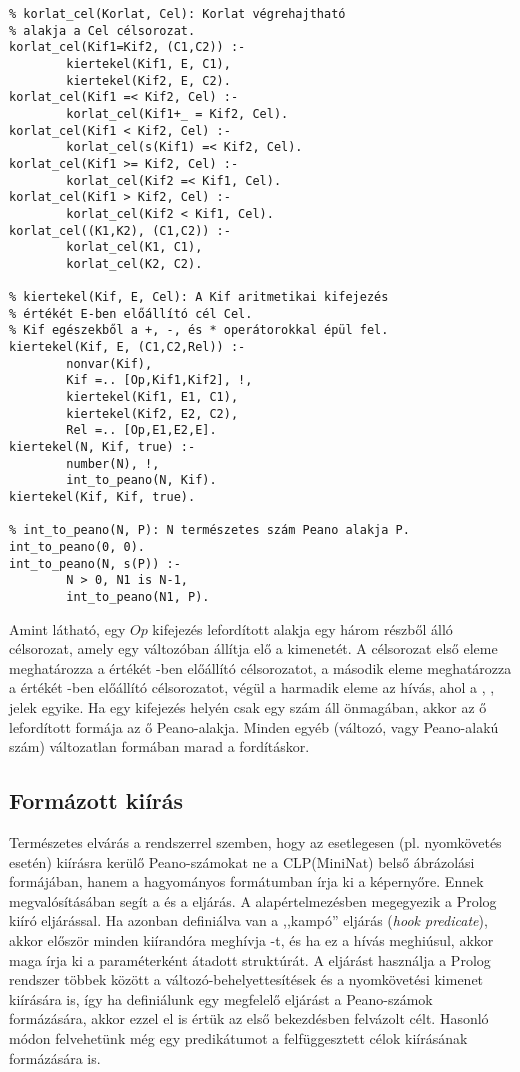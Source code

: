\begin{verbatim}
% korlat_cel(Korlat, Cel): Korlat végrehajtható
% alakja a Cel célsorozat.
korlat_cel(Kif1=Kif2, (C1,C2)) :-
        kiertekel(Kif1, E, C1), 
        kiertekel(Kif2, E, C2). 
korlat_cel(Kif1 =< Kif2, Cel) :- 
        korlat_cel(Kif1+_ = Kif2, Cel). 
korlat_cel(Kif1 < Kif2, Cel) :- 
        korlat_cel(s(Kif1) =< Kif2, Cel). 
korlat_cel(Kif1 >= Kif2, Cel) :- 
        korlat_cel(Kif2 =< Kif1, Cel). 
korlat_cel(Kif1 > Kif2, Cel) :- 
        korlat_cel(Kif2 < Kif1, Cel). 
korlat_cel((K1,K2), (C1,C2)) :- 
        korlat_cel(K1, C1), 
        korlat_cel(K2, C2). 

% kiertekel(Kif, E, Cel): A Kif aritmetikai kifejezés 
% értékét E-ben előállító cél Cel. 
% Kif egészekből a +, -, és * operátorokkal épül fel. 
kiertekel(Kif, E, (C1,C2,Rel)) :- 
        nonvar(Kif), 
        Kif =.. [Op,Kif1,Kif2], !, 
        kiertekel(Kif1, E1, C1), 
        kiertekel(Kif2, E2, C2), 
        Rel =.. [Op,E1,E2,E]. 
kiertekel(N, Kif, true) :- 
        number(N), !,  
        int_to_peano(N, Kif). 
kiertekel(Kif, Kif, true). 

% int_to_peano(N, P): N természetes szám Peano alakja P. 
int_to_peano(0, 0). 
int_to_peano(N, s(P)) :- 
        N > 0, N1 is N-1,  
        int_to_peano(N1, P).
\end{verbatim}

Amint látható, egy  $Op$  kifejezés lefordított alakja
egy három részből álló célsorozat, amely egy  változóban állítja
elő a kimenetét. A célsorozat első eleme meghatározza a  értékét
-ben előállító célsorozatot, a második eleme meghatározza a
 értékét -ben előállító célsorozatot, végül a harmadik
eleme az  hívás, ahol  a \cd{+}, \cd{-}, \cd{*}
jelek egyike. Ha egy kifejezés helyén csak egy szám áll önmagában, akkor az ő
lefordított formája az ő Peano-alakja. Minden egyéb (változó, vagy Peano-alakú
szám) változatlan formában marad a fordításkor.

\subsection{Formázott kiírás}

Természetes elvárás a rendszerrel szemben, hogy az esetlegesen (pl. nyomkövetés
esetén) kiírásra kerülő Peano-számokat ne a CLP(MiniNat) belső ábrázolási
formájában, hanem a hagyományos formátumban írja ki a képernyőre. Ennek
megvalósításában segít a  és a  eljárás.
\br
A  alapértelmezésben megegyezik a  Prolog kiíró
eljárással. Ha azonban definiálva van a  ,,kampó'' eljárás
(\emph{hook predicate}), akkor először minden kiírandóra meghívja
-t, és ha ez a hívás meghiúsul, akkor maga írja ki a
paraméterként átadott struktúrát. A  eljárást használja a
Prolog rendszer többek között a változó-behelyettesítések és a nyomkövetési
kimenet kiírására is, így ha definiálunk egy megfelelő 
eljárást a Peano-számok formázására, akkor ezzel el is értük az első
bekezdésben felvázolt célt. Hasonló módon felvehetünk még egy 
predikátumot a felfüggesztett célok kiírásának formázására is.

